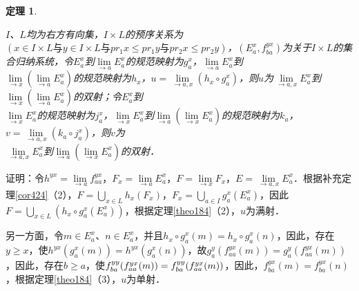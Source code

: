\documentclass[12pt, a4paper, oneside]{book}
\newtheorem{theo}{定理}
\begin{document}
			\begin{theo}\label{theo190}
				\hfill\par
				$I$、$L$均为右方有向集，$I\times L$的预序关系为$(x\in I\times L\text{与}y\in I\times L\text{与}pr_1x\leq pr_1y\text{与}pr_2x\leq pr_2y)$，$(E_a^x, f_{ba}^{yx})$为关于$I\times L$的集合归纳系统，令$E_a^x$到$\lim\limits_{\to a}E_a^x$的规范映射为$g_a^x$，$\lim\limits_{\to a}E_a^x$到\\$\lim\limits_{\to x}(\lim\limits_{\to a}E_a^x)$的规范映射为$h_x$，$u=\lim\limits_{\to a, x}(h_x\circ g_a^x)$，则$u$为$\lim\limits_{\to a, x}E_a^x$到$\lim\limits_{\to x}(\lim\limits_{\to a}E_a^x)$的双射；令$E_a^x$到\\$\lim\limits_{\to x}E_a^x$的规范映射为$j_a^x$，$\lim\limits_{\to x}E_a^x$到$\lim\limits_{\to a}(\lim\limits_{\to x}E_a^x)$的规范映射为$k_a$，$v=\lim\limits_{\to a, x}(k_a\circ j_a^x)$，则$v$为\\$\lim\limits_{\to a, x}E_a^x$到$\lim\limits_{\to a}(\lim\limits_{\to x}E_a^x)$的双射．
			\end{theo}
			证明：令$h^{yx}= \lim\limits_{\to a}f_{aa}^{yx}$，$F_x=\lim\limits_{\to a}E_a^x$，$F=\lim\limits_{\to x}F_x$，$E=\lim\limits_{\to a, x}E_a^x$．根据补充定理\ref{cor424}（2），$F=\bigcup\limits_{x\in L}h_x(F_x)$，$F_x=\bigcup\limits_{a\in I}g_a^x(E_a^x)$，因此$F=\bigcup\limits_{x\in L}(h_x\circ g_a^x(E_a^x))$，根据定理\ref{theo184}（2），$u$为满射．
			\par
			另一方面，令$m\in E_a^x$、$n\in E_a^x$，并且$h_x\circ g_a^x(m)=h_x\circ g_a^x(n)$，因此，存在$y\geq x$，使$h^{yx}(g_a^x(m))=h^{yx}(g_a^x(n))$，故$g_a^y(f_{aa}^{yx}(m))=g_a^y(f_{aa}^{yx}(m))$，因此，存在$b\geq a$，使$f_{ba}^{yy}(f_{aa}^{yx}(m))\\=f_{ba}^{yy}(f_{aa}^{yx}(m))$，因此，$f_{ba}^{yx}(m)=f_{ba}^{yx}(n)$，根据定理\ref{theo184}（3），$u$为单射．
			
\end{document}
